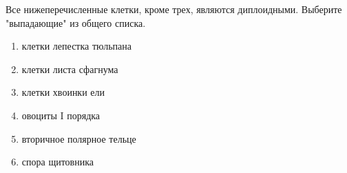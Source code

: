 Все нижеперечисленные клетки, кроме трех, являются диплоидными. Выберите "выпадающие" из общего списка.

\begin{enumerate}
    \item клетки лепестка тюльпана
    \item клетки листа сфагнума
    \item клетки хвоинки ели
    \item овоциты I порядка
    \item вторичное полярное тельце
    \item спора щитовника
\end{enumerate}